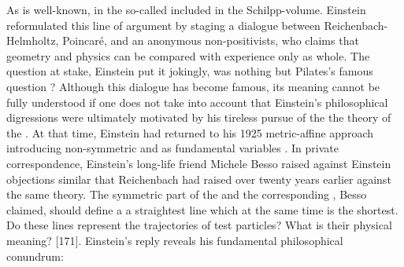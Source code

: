 \documentclass[draft]{article}
\begin{document}
As is well-known, in the so-called  included in the Schilpp-volume. Einstein reformulated this line of argument by staging a dialogue between Reichenbach-Helmholtz, Poincaré, and an anonymous non-positivists, who claims that geometry and physics can be compared with experience only as whole. The question at stake, Einstein put it jokingly, was nothing but Pilates's famous question ? Although this dialogue has become  famous, its meaning cannot be fully understood if one does not take into account that Einstein's philosophical digressions were ultimately motivated by his tireless pursue of the the theory of the . At that time, Einstein had returned to his 1925 metric-affine approach introducing non-symmetric \gmn and \Gtmn as fundamental variables \cite{Einstein1945,Einstein1945-04}. In private correspondence, Einstein's long-life friend Michele Besso raised against Einstein objections similar that Reichenbach had raised over twenty years earlier against the same theory. The symmetric part of the \gmn and the corresponding \Gtmn, Besso claimed, should define a a straightest line which at the same time is the shortest. Do these lines represent the trajectories of test particles? What is their physical meaning? [171]. Einstein's reply reveals his fundamental philosophical conundrum:

\end{document}
